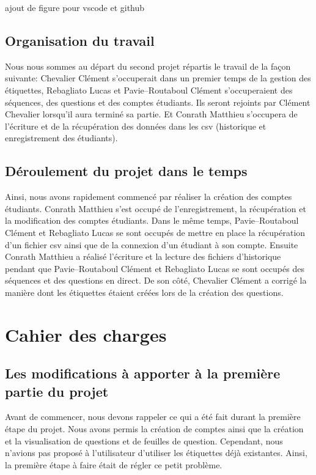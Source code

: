 \documentclass[a4paper, 12pt]{article}
\begin{document}
ajout de figure pour vscode et github

\subsection{Organisation du travail}

Nous nous sommes au départ du second projet répartis le travail de la façon suivante: 
\newline
Chevalier Clément s'occuperait dans un premier temps de la gestion des étiquettes, Rebagliato Lucas et Pavie--Routaboul Clément s'occuperaient des séquences, des questions et des comptes étudiants.
Ils seront rejoints par Clément Chevalier lorsqu'il aura terminé sa partie. 
Et Conrath Matthieu s'occupera de l'écriture et de la récupération des données dans les csv (historique et enregistrement des étudiants).

\subsection{Déroulement du projet dans le temps}

Ainsi, nous avons rapidement commencé par réaliser la création des comptes étudiants.
Conrath Matthieu s'est occupé de l'enregistrement, la récupération et la modification des comptes étudiants.
Dans le même temps, Pavie--Routaboul Clément et Rebagliato Lucas se sont occupés de mettre en place la récupération d'un fichier csv ainsi que de la connexion d'un étudiant à son compte. 
Ensuite Conrath Matthieu a réalisé l'écriture et la lecture des fichiers d'historique pendant que Pavie--Routaboul Clément et Rebagliato Lucas se sont occupés des séquences et des questions en direct. 
De son côté, Chevalier Clément a corrigé la manière dont les étiquettes étaient créées lors de la création des questions.   

\section{Cahier des charges}
\subsection{Les modifications à apporter à la première partie du projet}

Avant de commencer, nous devons rappeler ce qui a été fait durant la première étape du projet. 
Nous avons permis la création de comptes ainsi que la création et la visualisation de questions et de feuilles de question. Cependant, nous n’avions pas proposé à l'utilisateur d'utiliser les étiquettes déjà existantes. Ainsi, la première étape à faire était de régler ce petit problème.
\end{document}
